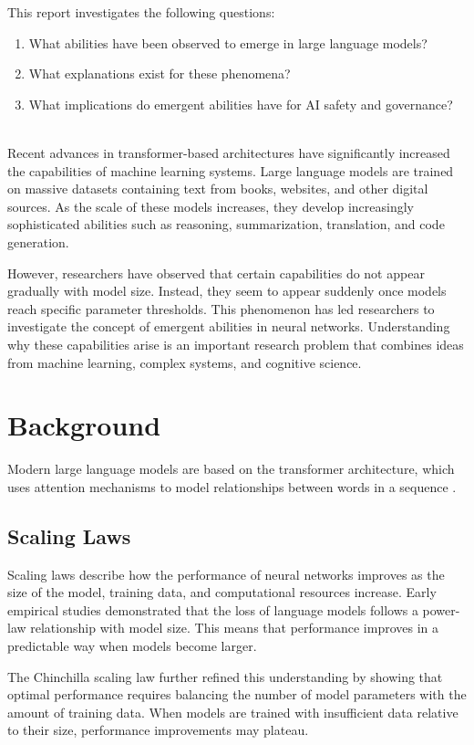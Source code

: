 \documentclass[conference]{IEEEtran}
\begin{document}
This report investigates the following questions:

\begin{enumerate}
\item What abilities have been observed to emerge in large language models?
\item What explanations exist for these phenomena?
\item What implications do emergent abilities have for AI safety and governance?
\\
\\
\end{enumerate}
Recent advances in transformer-based architectures have significantly increased the capabilities of machine learning systems. Large language models are trained on massive datasets containing text from books, websites, and other digital sources. As the scale of these models increases, they develop increasingly sophisticated abilities such as reasoning, summarization, translation, and code generation. 

However, researchers have observed that certain capabilities do not appear gradually with model size. Instead, they seem to appear suddenly once models reach specific parameter thresholds. This phenomenon has led researchers to investigate the concept of emergent abilities in neural networks. Understanding why these capabilities arise is an important research problem that combines ideas from machine learning, complex systems, and cognitive science.

\section{Background}
Modern large language models are based on the transformer architecture, which uses attention mechanisms to model relationships between words in a sequence \cite{vaswani2017attention}.
\subsection{Scaling Laws}

Scaling laws describe how the performance of neural networks improves as the size of the model, training data, and computational resources increase. Early empirical studies demonstrated that the loss of language models follows a power-law relationship with model size. This means that performance improves in a predictable way when models become larger.

The Chinchilla scaling law further refined this understanding by showing that optimal performance requires balancing the number of model parameters with the amount of training data. When models are trained with insufficient data relative to their size, performance improvements may plateau.
\end{document}
